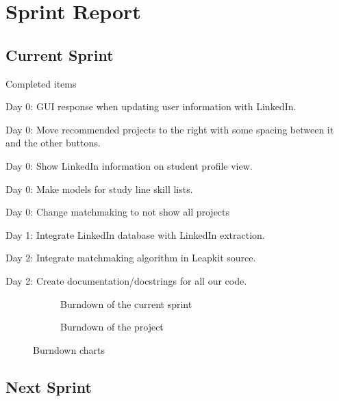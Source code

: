 \section{Sprint Report}

\subsection{Current Sprint}
Completed items
\begin{itemize*}
    \item Day 0: GUI response when updating user information with LinkedIn.
    \item Day 0: Move recommended projects to the right with some spacing between it and the other buttons.
    \item Day 0: Show LinkedIn information on student profile view.
    \item Day 0: Make models for study line skill lists.
    \item Day 0: Change matchmaking to not show all projects
    \item Day 1: Integrate LinkedIn database with LinkedIn extraction.
    \item Day 2: Integrate matchmaking algorithm in Leapkit source.
    \item Day 2: Create documentation/docstrings for all our code.
\end{itemize*}

\begin{figure}[!ht]
    \centering
    \begin{subfigure}[b]{0.5\textwidth}
        \scalebox{.6}{}
        \caption{Burndown of the current sprint}
        \label{fig:burndownSprint}
    \end{subfigure}%
    \begin{subfigure}[b]{0.5\textwidth}
        \scalebox{.7}{}
        \caption{Burndown of the project}
        \label{fig:burndownProject}
    \end{subfigure}
    \caption{Burndown charts}
    \label{fig:burndown}
\end{figure}

\subsection{Next Sprint}


